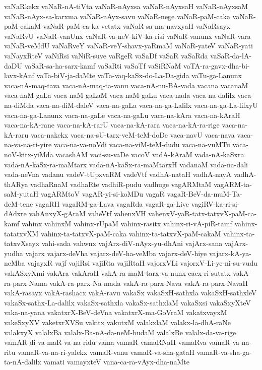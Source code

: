 {vaNaRkekx
vaNaR-nA-tiVta
vaNaR-nAyxsa
vaNaR-nAyxsaH
vaNaR-nAyxsaM
vaNaR-nAyx-sa-karxma
vaNaR-nAyx-savu
vaNaR-nege
vaNaR-paM-caka
vaNaR-paM-cakaM
vaNaR-paM-ca-ka-vetatx
vaNaR-sa-ma-navxyaH
vaNaRsayx
vaNaRvU
vaNaR-vanUnx
vaNaR-va-neV-kiV-ka-risi
vaNaR-vanunx
vaNaR-vara
vaNaR-veMdU
vaNaRveY
vaNaR-veY-shavx-yaRmaM
vaNaR-yateV
vaNaR-yati
vaNayxRteV
vaNiRsi
vaNiR-suve
vaRgeR
vaSaDf
vaSaR
vaSaRda
vaSaR-da-lA-daDU
vaSaR-sa-ha-sarx-kamf
vaSaRti
vaSaTf
vaSiRNaM
vaTA-ra-gavx-dha-bi-lavx-kAnf
vaTa-biV-ja-daMte
vaTa-vaq-kaSx-do-La-Da-gida
vaTu-ga-Lanunx
vaca-nA-maq-tava
vaca-nA-maq-ta-vanu
vaca-nA-nu-BA-vada
vacana
vacanaM
vaca-naM-gaLa
vaca-naM-gaLaM
vaca-naM-gaLu
vaca-nada
vaca-na-dalilx
vaca-na-diMda
vaca-na-diM-daleV
vaca-na-gaLa
vaca-na-ga-Lalilx
vaca-na-ga-La-lilxyU
vaca-na-ga-Lanunx
vaca-na-gaLe
vaca-na-gaLu
vaca-na-kAra
vaca-na-kAraH
vaca-na-kA-rane
vaca-na-kA-rarU
vaca-na-kA-rara
vaca-na-kA-ra-rige
vaca-na-kA-raru
vaca-nakekx
vaca-na-sU-tarx-veM-teM-doDe
vaca-navU
vaca-nava
vaca-na-va-na-ri-yire
vaca-na-va-noVdi
vaca-na-viM-teM-dudu
vaca-na-vuMTu
vaca-noV-kitx-yiMda
vacashAM
vaci-su-vaDe
vacoV
vadA-kAraM
vada-nA-kaSxra
vada-nA-kaSx-ra-maMtarx
vada-nA-kaSx-ra-maMtarxH
vadanaM
vada-na-dali
vada-neVna
vadanu
vadeV-tUpxvaRM
vadeVtf
vadhA-nataH
vadhA-nayA
vadhA-thARya
vadhaRnaM
vadhaRte
vadhiR-pudu
vadhuge
vagARMtaM
vagARM-ta-saM-yutaH
vagARMtoV
vagAR-yi-si-koMDu
vagaR
vagaR-BeV-da-muM-Ta-deM-tene
vagaRH
vagaRM-ga-Lava
vagaRda
vagaR-ga-Live
vagiRV-ka-ri-si-dAdxre
vahAnxyX-gAraM
vaheVtf
vahenxVH
vahenxV-yaR-tatx-tatxvX-paM-ca-kamf
vahinx
vahinxM
vahinx-rUpaM
vahinx-rasitx
vahinx-ri-vA-piR-tamf
vahinx-tatatxvXM
vahinx-ta-tatxvX-paM-caka
vahinx-ta-tatxvX-paM-cakaM
vahinx-ta-tatxvXsayx
vahi-sada
vahwnx
vajArx-diV-nAyx-yu-dhAni
vajArx-sana
vajArx-yudha
vajarx
vajarx-deVha
vajarx-deV-ha-veMba
vajarx-deV-hiye
vajarx-kA-ya-neMba
vajayxR
vajf
vajiRsi
vajiRta
vajiRtaH
vajorxVLi
vajorxV-Li-ye-ni-su-vudu
vakASxyXmi
vakAra
vakAraH
vakA-ra-maM-tarx-va-nunx-cacx-ri-sutatx
vakA-ra-parx-Nama
vakA-ra-parx-Na-mada
vakA-ra-parx-Nava
vakA-ra-parx-NavaH
vakA-rasayx
vakA-rashacx
vakA-ravu
vakaSx
vakaSxH-sathxla
vakaSxH-sathxleV
vakaSx-sathx-La-dalilx
vakaSx-sathxla
vakaSx-sathxlaM
vakaSxsi
vakaSxyXteV
vaka-na-yana
vakatxrX-BeV-deVna
vakatxrX-ma-GoVraM
vakatxvayxM
vakeSxyXV
vaketxrXVSu
vakitx
vakutxM
valakxlaM
valakx-la-dhA-raNe
valakxyX
valalxBa
valalx-Ba-nA-da-neM-budaM
valalxBe
valalx-da-va-rige
vamAR-di-va-maR-va-na-ridu
vama
vamaR
vamaRNaH
vamaRva
vamaR-va-na-ritu
vamaR-va-na-ri-yalekx
vamaR-vanu
vamaR-va-sha-gataH
vamaR-va-sha-ga-ta-nA-dalilx
vamati
vamayxteV
vana-ca-ra-vAyx-dha-naMte
}
